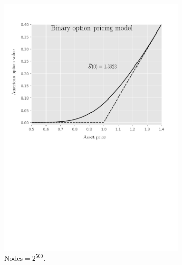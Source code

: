\begin{figure}[tbp]
  \centering
  \begin{subfigure}{0.4\textwidth}
    \centering
    \includegraphics[width=\textwidth]{chapters/chapter5/TestCase3LcpBOPM.pdf}
    \caption{$\text{Nodes} = 2^{500}$.}
    \label{fig:lcp:numericaresults:test_case_3_bopm}
  \end{subfigure}
  \hspace{0.5cm}
  \begin{subfigure}{0.4\textwidth}
    \centering

\end{subfigure}
\end{figure}
